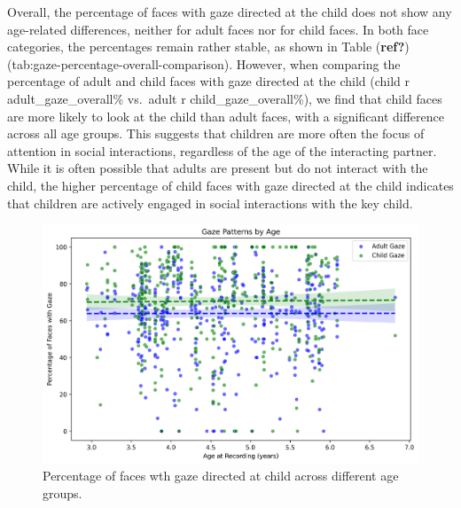 \documentclass[
  man,floatsintext]{apa6}
\begin{document}
Overall, the percentage of faces with gaze directed at the child does not show any age-related differences, neither for adult faces nor for child faces. In both face categories, the percentages remain rather stable, as shown in Table (\textbf{ref?})(tab:gaze-percentage-overall-comparison). However, when comparing the percentage of adult and child faces with gaze directed at the child (child r adult\_gaze\_overall\% vs.~adult r child\_gaze\_overall\%), we find that child faces are more likely to look at the child than adult faces, with a significant difference across all age groups. This suggests that children are more often the focus of attention in social interactions, regardless of the age of the interacting partner. While it is often possible that adults are present but do not interact with the child, the higher percentage of child faces with gaze directed at the child indicates that children are actively engaged in social interactions with the key child.

\begin{figure}

{\centering \includegraphics[width=450px]{images/gaze_patterns_by_age} 

}

\caption{Percentage of faces wth gaze directed at child across different age groups.}\label{fig:gaze-patterns}
\end{figure}
\end{document}
